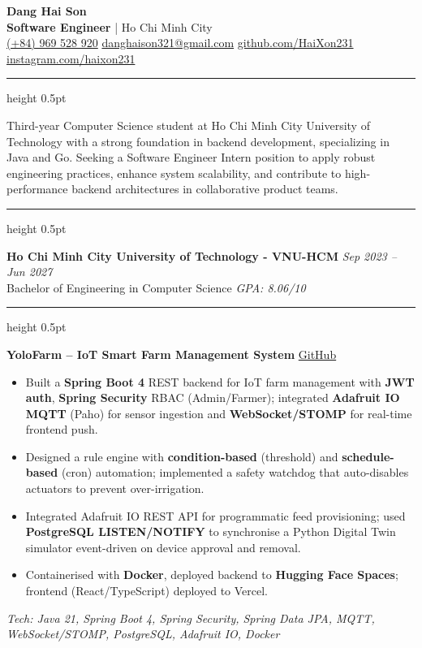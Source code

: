 \documentclass[11pt,a4paper]{article}
\newcommand{\cvitem}[1]{\item \normalsize #1}
\newcommand{\kw}[1]{\textbf{#1}}
\newcommand{\cvsection}[1]{
  \vspace{2pt}
  \noindent{\large\bfseries\scshape #1}\hspace{0.45em}\textcolor{black!55}{\leaders\hrule height 0.5pt\hfill}\par\vspace{1pt}
}
\newcommand{\projectheader}[2]{
  \vspace{2pt}
  \noindent\textcolor{accent}{\textbf{#1}} \hfill {\footnotesize\href{#2}{GitHub}}\par
  \vspace{1pt}
}
\begin{document}
\begin{center}
{\fontsize{22}{24}\selectfont \textbf{Dang Hai Son}}\\[-1pt]
{\large \textbf{Software Engineer} \;|\; Ho Chi Minh City}\\[1pt]
\normalsize
\href{tel:+84969528920}{(+84) 969 528 920}
\;\textbullet\;
\href{mailto:danghaison321@gmail.com}{danghaison321@gmail.com}
\;\textbullet\;
\href{https://github.com/HaiXon231}{github.com/HaiXon231}
\;\textbullet\;
\href{https://www.instagram.com/haixon231}{instagram.com/haixon231}
\end{center}

\cvsection{PROFILE}
\normalsize Third-year Computer Science student at Ho Chi Minh City University of Technology with a strong foundation in backend development, specializing in Java and Go. Seeking a Software Engineer Intern position to apply robust engineering practices, enhance system scalability, and contribute to high-performance backend architectures in collaborative product teams.

\cvsection{EDUCATION}
\textbf{Ho Chi Minh City University of Technology - VNU-HCM} \hfill \textit{Sep 2023 -- Jun 2027}\\
\normalsize Bachelor of Engineering in Computer Science \hfill \textit{GPA: 8.06/10}

\cvsection{PROJECTS}
\projectheader{YoloFarm -- IoT Smart Farm Management System}{https://github.com/HaiXon231/YoloFarm}
\begin{itemize}[leftmargin=*,itemsep=1pt,topsep=0pt,parsep=0pt,partopsep=0pt]
  \cvitem{Built a \kw{Spring Boot 4} REST backend for IoT farm management with \kw{JWT auth}, \kw{Spring Security} RBAC (Admin/Farmer); integrated \kw{Adafruit IO MQTT} (Paho) for sensor ingestion and \kw{WebSocket/STOMP} for real-time frontend push.}
  \cvitem{Designed a rule engine with \kw{condition-based} (threshold) and \kw{schedule-based} (cron) automation; implemented a safety watchdog that auto-disables actuators to prevent over-irrigation.}
  \cvitem{Integrated Adafruit IO REST API for programmatic feed provisioning; used \kw{PostgreSQL LISTEN/NOTIFY} to synchronise a Python Digital Twin simulator event-driven on device approval and removal.}
  \cvitem{Containerised with \kw{Docker}, deployed backend to \kw{Hugging Face Spaces}; frontend (React/TypeScript) deployed to Vercel.}
\end{itemize}
\normalsize \textit{Tech: Java 21, Spring Boot 4, Spring Security, Spring Data JPA, MQTT, WebSocket/STOMP, PostgreSQL, Adafruit IO, Docker}
\end{document}
